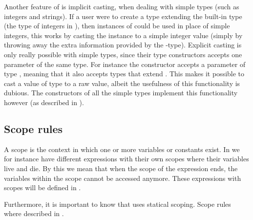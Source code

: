 Another feature of \productname{} is implicit casting, when dealing with simple
types (such as integers and strings). If a user were to create a type
 extending the built-in type  (the type of
integers in \productname{}), then instances of  could be used in
place of simple integers, this works by casting the instance to a simple integer
value (simply by throwing away the extra information provided by the
-type). Explicit casting is only really possible with simple
types, since their type constructors accepts one parameter of the same type. For
instance the constructor  accepts a parameter of type
, meaning that it also accepts types that extend .
This makes it possible to cast a value of type  to a raw
 value, albeit the usefulness of this functionality is dubious.
The constructors of all the simple types implement this functionality however
(as described in ).

\subsection*{Scope rules}

A scope is the context in which one or more variables or constants exist. In
\productname{} we for instance have different expressions with their own scopes
where their variables live and die. By this we mean that when the scope of the
expression ends, the variables within the scope cannot be accessed anymore.
These expressions with scopes will be defined in .

Furthermore, it is important to know that \productname{} uses statical scoping.
Scope rules where described in .








